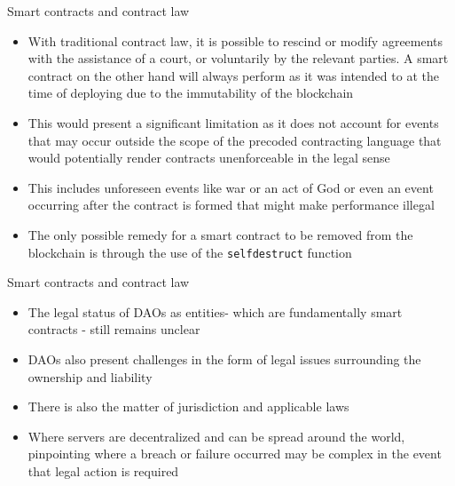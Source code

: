 \documentclass[9pt]{beamer}
\begin{document}

\begin{frame}{Smart contracts and contract law}
	\begin{itemize}
		\item With traditional contract law, it is possible to rescind or modify agreements with the assistance of a court, or voluntarily by the relevant parties. A smart contract on the other hand will always perform as it was intended to at the time of deploying due to the immutability of the blockchain
		\item This would present a significant limitation as it does not account for events that may occur outside the scope of the precoded contracting language that would potentially render contracts unenforceable in the legal sense
		\item This includes unforeseen events like war or an act of God or even  an event occurring after the contract is formed that might make performance illegal
		\item The only possible remedy for a smart contract to be removed from the blockchain is through the use of the \texttt{selfdestruct} function
	\end{itemize}
\end{frame}


\begin{frame}{Smart contracts and contract law}
	\begin{itemize}
		\item The legal status of DAOs as entities- which are fundamentally smart contracts - still remains unclear
		\item DAOs also present challenges in the form of legal issues surrounding the ownership and liability
		\item There is also the matter of jurisdiction and applicable laws
		\item Where servers are decentralized and can be spread around the world, pinpointing where a breach or failure occurred may be complex in the event that legal action is required
	\end{itemize}
\end{frame}

\end{document}
